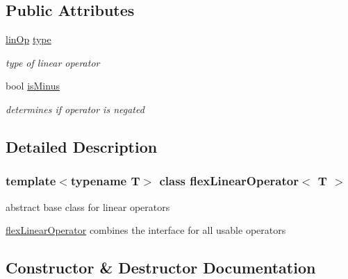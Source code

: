 \subsection*{Public Attributes}
\begin{DoxyCompactItemize}
\item 
\hyperlink{tools_8h_a3fc67a2f9370c09fecbd90da67687d36}{lin\+Op} \hyperlink{classflex_linear_operator_a80b240d65c64cb9843e28da602995940}{type}
\begin{DoxyCompactList}\small\item\em type of linear operator \end{DoxyCompactList}\item 
\mbox{\label{classflex_linear_operator_a7f986517e10aee21099ec7692b77905d}} 
bool \hyperlink{classflex_linear_operator_a7f986517e10aee21099ec7692b77905d}{is\+Minus}
\begin{DoxyCompactList}\small\item\em determines if operator is negated \end{DoxyCompactList}\end{DoxyCompactItemize}


\subsection{Detailed Description}
\subsubsection*{template$<$typename T$>$\newline
class flex\+Linear\+Operator$<$ T $>$}

abstract base class for linear operators 

\hyperlink{classflex_linear_operator}{flex\+Linear\+Operator} combines the interface for all usable operators 

\subsection{Constructor \& Destructor Documentation}
\mbox{\label{classflex_linear_operator_ab4a525e1069965d018b8f4371db60234}} 
